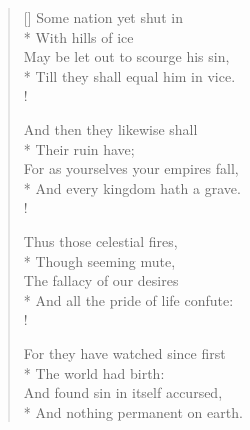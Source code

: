 \documentclass[MAIN]{subfiles}
\begin{document}
\begin{verse}[\versewidth]
\vin Some nation yet shut in\\*
\vin \vin With hills of ice\\
May be let out to scourge his sin,\\*
Till they shall equal him in vice.\\!

\vin And then they likewise shall\\*
\vin \vin Their ruin have;\\
For as yourselves your empires fall,\\*
And every kingdom hath a grave.\\!

\vin Thus those celestial fires,\\*
\vin \vin Though seeming mute,\\
The fallacy of our desires\\*
And all the pride of life confute:\\!

\vin For they have watched since first\\*
\vin \vin The world had birth:\\
And found sin in itself accursed,\\*
And nothing permanent on earth.
\end{verse}
\end{document}
